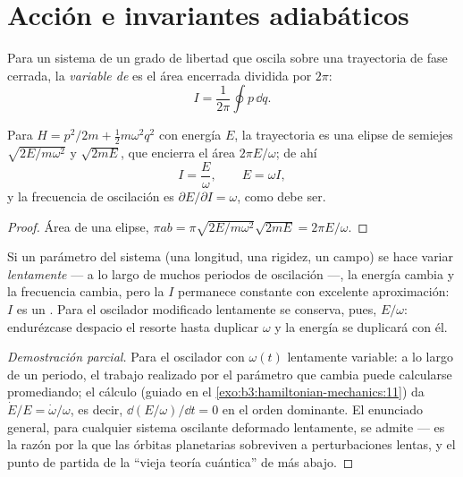 \section{Acción e invariantes adiabáticos}

\begin{definition}\label{def:b3:hamiltonian-mechanics:action-variable}
Para un sistema de un grado de libertad que oscila sobre una trayectoria de
fase cerrada, la \emph{variable de } es el área encerrada dividida por
$2\pi$:
\[
I = \frac{1}{2\pi}\oint p\,\dd q .
\]
\end{definition}

\begin{proposition}\label{prop:b3:hamiltonian-mechanics:sho-action}
Para $H = p^2/2m + \tfrac12 m\omega^2q^2$ con energía $E$, la trayectoria
es una elipse de semiejes $\sqrt{2E/m\omega^2}$ y $\sqrt{2mE}$, que encierra
el área $2\pi E/\omega$; de ahí
\[
I = \frac{E}{\omega} , \qquad E = \omega I ,
\]
y la frecuencia de oscilación es $\partial E/\partial I = \omega$, como debe
ser.
\end{proposition}

\begin{proof}
Área de una elipse, $\pi ab = \pi\sqrt{2E/m\omega^2}\sqrt{2mE} =
2\pi E/\omega$.
\end{proof}

\begin{proposition}\label{prop:b3:hamiltonian-mechanics:adiabatic}
Si un parámetro del sistema (una longitud, una rigidez, un campo) se hace
variar \emph{lentamente} --- a lo largo de muchos periodos de oscilación
---, la energía cambia y la frecuencia cambia, pero la  $I$ permanece
constante con excelente aproximación: $I$ es un \emph{}. Para el oscilador modificado lentamente se conserva, pues,
$E/\omega$: endurézcase despacio el resorte hasta duplicar $\omega$ y la
energía se duplicará con él.
\end{proposition}

\begin{proof}[Demostración parcial]
Para el oscilador con $\omega(t)$ lentamente variable: a lo largo de un
periodo, el trabajo realizado por el parámetro que cambia puede calcularse
promediando; el cálculo (guiado en el \cref{exo:b3:hamiltonian-mechanics:11})
da $\dot E/E = \dot\omega/\omega$, es decir, $\dd(E/\omega)/\dd t = 0$
en el orden dominante. El enunciado general, para cualquier sistema
oscilante deformado lentamente, se admite --- es la razón por la que las
órbitas planetarias sobreviven a perturbaciones lentas, y el punto de
partida de la ``vieja teoría cuántica'' de más abajo.
\end{proof}

